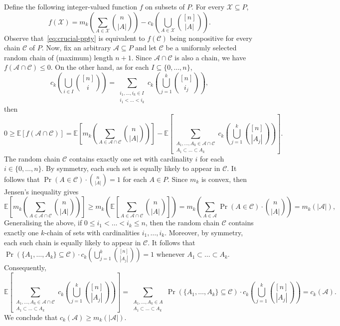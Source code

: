 \documentclass[11pt,a4paper,reqno]{amsart}
\numberwithin{claim}{thm}
\theoremstyle{definition}
\newcommand{\cA}{\mathcal{A}}
\newcommand{\cC}{\mathcal{C}}
\newcommand{\cX}{\mathcal{X}}
\newcommand{\Ex}{\mathbb{E}}
\renewcommand{\le}{\leqslant}
\renewcommand{\ge}{\geqslant}
\begin{document}
Define the following integer-valued function $f$ on subsets of $P$. For every $\cX \subseteq P$,
\[
  f(\cX) = m_k\left( \sum_{A \in \cX} \binom{n}{|A|} \right) - c_k\left( \bigcup_{A \in \cX} \binom{[n]}{|A|}\right).
\]
Observe that~\eqref{eq:crucial-ppty} is equivalent to $f(\cC)$ being nonpositive for every chain $\cC$ of $P$. Now, fix an arbitrary $\cA \subseteq P$ and let $\cC$ be a uniformly selected random chain of (maximum) length $n+1$. Since $\cA \cap \cC$ is also a chain, we have $f(\cA \cap \cC) \le 0$. On the other hand, as for each $I \subseteq \{0, \dotsc, n\}$,
\[
  c_k\left( \bigcup_{i \in I} \binom{[n]}{i} \right) = \sum_{\substack{i_1, \dotsc, i_k \in I \\ i_1 < \dotsc < i_k}} c_k\left( \bigcup_{j = 1}^k \binom{[n]}{i_j} \right),
\]
then
\[
  0 \ge \Ex[f(\cA \cap \cC)] = \Ex\left[m_k\left(\sum_{A \in \cA \cap \cC} \binom{n}{|A|} \right)\right] - \Ex\left[ \sum_{\substack{A_1, \dotsc, A_k \in \cA \cap \cC \\ A_1 \subset \dotsc \subset A_k}} c_k\left(\bigcup_{j=1}^k \binom{[n]}{|A_j|} \right) \right].
\]
The random chain $\cC$ contains exactly one set with cardinality $i$ for each $i \in \{0, \dotsc, n\}$. By symmetry, each such set is equally likely to appear in $\cC$. It follows that $\Pr(A \in \cC) \cdot \binom{n}{|A|} = 1$ for each $A \in P$. Since $m_k$ is convex, then Jensen's inequality gives
\[
  \Ex\left[m_k\left(\sum_{A \in \cA \cap \cC} \binom{n}{|A|} \right)\right] \ge m_k\left(   \Ex\left[\sum_{A \in \cA \cap \cC} \binom{n}{|A|}\right]  \right) = m_k\left( \sum_{A \in \cA} \Pr(A \in \cC) \cdot \binom{n}{|A|}\right) = m_k(|\cA|),
\]
Generalising the above, if $0 \le i_1 < \dotsc < i_k \le n$, then the random chain $\cC$ contains exactly one $k$-chain of sets with cardinalities $i_1, \dotsc, i_k$. Moreover, by symmetry, each such chain is equally likely to appear in $\cC$. It follows that $\Pr(\{A_1, \dotsc, A_k\} \subseteq \cC) \cdot c_k\left(\bigcup_{j=1}^k \binom{[n]}{|A_j|} \right) = 1$ whenever $A_1 \subset \dotsc \subset A_k$. Consequently,
\[
  \Ex\left[ \sum_{\substack{A_1, \dotsc, A_k \in \cA \cap \cC \\ A_1 \subset \dotsc \subset A_k}} c_k\left(\bigcup_{j=1}^k \binom{[n]}{|A_j|} \right) \right] = \sum_{\substack{A_1, \dotsc, A_k \in A \\ A_1 \subset \dotsc \subset A_k}} \Pr(\{A_1, \dotsc, A_k\} \subseteq \cC) \cdot c_k\left(\bigcup_{j=1}^k \binom{[n]}{|A_j|} \right) = c_k(\cA).
\]
We conclude that $c_k(\cA) \ge m_k(|\cA|)$.
\end{document}
